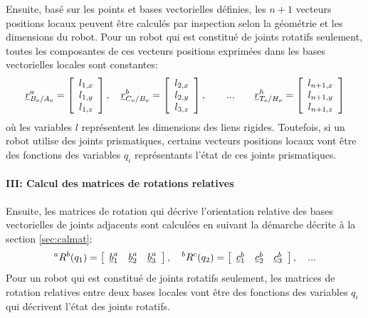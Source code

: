 Ensuite, basé sur les points et bases vectorielles définies, les $n+1$ vecteurs positions locaux peuvent être calculés par inspection selon la géométrie et les dimensions du robot. Pour un robot qui est constitué de joints rotatifs seulement, toutes les composantes de ces vecteurs positions exprimées dans les bases vectorielles locales sont constantes:
\begin{align}
	\underline{r}_{B_o/A_o}^a =
	\left[ \begin{array}{c}
			   l_{1,x} \\ l_{1,y} \\ l_{1,z}
	\end{array} \right], \quad
	\underline{r}_{C_o/B_o}^b =
	\left[ \begin{array}{c}
			   l_{2,x} \\ l_{2,y} \\ l_{3,z}
	\end{array} \right], \quad\quad ... \quad\quad
	\underline{r}_{T_o/H_o}^h =
	\left[ \begin{array}{c}
			   l_{n+1,x} \\ l_{n+1,y} \\ l_{n+1,z}
	\end{array} \right]
\end{align}
où les variables $l$ représentent les dimensions des liens rigides. Toutefois, si un robot utilise des joints prismatiques, certains vecteurs positions locaux vont être des fonctions des variables $q_i$ représentants l'état de ces joints prismatiques.

\paragraph{III: Calcul des matrices de rotations relatives}

Ensuite, les matrices de rotation qui décrive l'orientation relative des bases vectorielles de joints adjacents sont calculées en suivant la démarche décrite à la section \ref{sec:calmat}:
\begin{align}
{}^aR^b( q_1 ) = \left[ \begin{array}{c c c}
							\underline{b}_1^a &
							\underline{b}_2^a &
							\underline{b}_3^a
\end{array} \right],
\quad
{}^bR^c( q_2 ) = \left[ \begin{array}{c c c}
							\underline{c}_1^b &
							\underline{c}_2^b &
							\underline{c}_3^b
\end{array} \right],
\quad ...
\end{align}
Pour un robot qui est constitué de joints rotatifs seulement, les matrices de rotation relatives entre deux bases locales vont être des fonctions des variables $q_i$ qui décrivent l'état des joints rotatifs.


